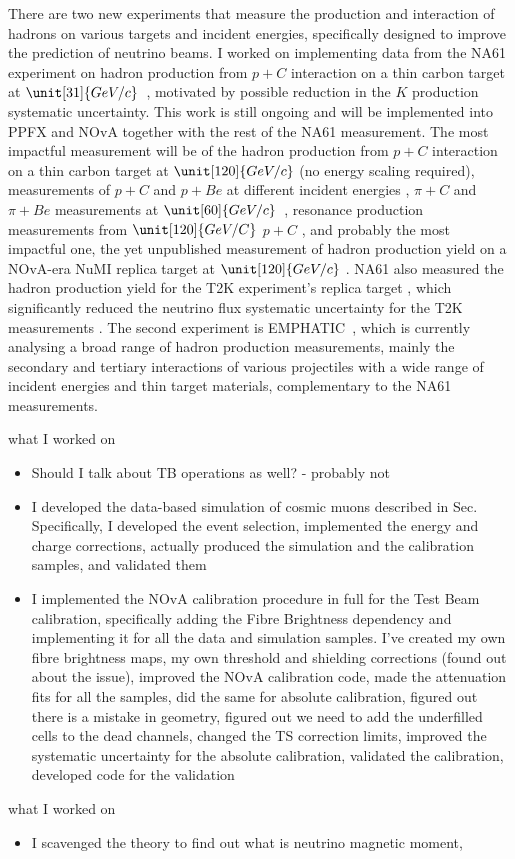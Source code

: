 There are two new experiments that measure the production and interaction of hadrons on various targets and incident energies, specifically designed to improve the prediction of neutrino beams. I worked on implementing data from the NA61 experiment on hadron production from $p+C$ interaction on a thin carbon target at $\unit[31]{GeV/c}$~\cite{2015_hadron_prod_pC_2009data.pdf}, motivated by possible reduction in the $K$ production systematic uncertainty. This work is still ongoing and will be implemented into PPFX and NOvA together with the rest of the NA61 measurement. The most impactful measurement will be of the hadron production from $p+C$ interaction on a thin carbon target at $\unit[120]{GeV/c}$ \cite{NA61_hadprodFrompC_120GeV_2023.pdf} (no energy scaling required), measurements of $p+C$ and $p+Be$ at different incident energies \cite{2019_NA61_ProdAndInelXSec_protonOnDiffTargets60And120GeV._results.pdf}, $\pi+C$ and $\pi+Be$ measurements at $\unit[60]{GeV/c}$~\cite{2019_had_prod_at_Pi_on_C_and_Be.pdf}, resonance production measurements from $\unit[120]{GeV/C}$ $p+C$ \cite{NA61_ResonanceProdFrompC_120GeV_2023.pdf}, and probably the most impactful one, the yet unpublished measurement of hadron production yield on a NOvA-era NuMI replica target at $\unit[120]{GeV/c}$ \cite{ThickTargetLimit.pdf}. NA61 also measured the hadron production yield for the T2K experiment's replica target \cite{2019_hadron_yields_T2K_replica.pdf}, which significantly reduced the neutrino flux systematic uncertainty for the T2K measurements \cite{ThickTargetLimit.pdf}. The second experiment is EMPHATIC~\cite{EMPHATICProposal2019.pdf}, which is currently analysing a broad range of hadron production measurements, mainly the secondary and tertiary interactions of various projectiles with a wide range of incident energies and thin target materials, complementary to the NA61 measurements.


what I worked on
\begin{itemize}
\item Should I talk about TB operations as well? - probably not
\item I developed the data-based simulation of cosmic muons described in Sec. Specifically, I developed the event selection, implemented the energy and charge corrections, actually produced the simulation and the calibration samples, and validated them
\item I implemented the NOvA calibration procedure in full for the Test Beam calibration, specifically adding the Fibre Brightness dependency and implementing it for all the data and simulation samples. I've created my own fibre brightness maps, my own threshold and shielding corrections (found out about the issue), improved the NOvA calibration code, made the attenuation fits for all the samples, did the same for absolute calibration, figured out there is a mistake in geometry, figured out we need to add the underfilled cells to the dead channels, changed the TS correction limits, improved the systematic uncertainty for the absolute calibration, validated the calibration, developed code for the validation
\end{itemize}


what I worked on
\begin{itemize}
\item I scavenged the theory to find out what is neutrino magnetic moment, 
\end{itemize}